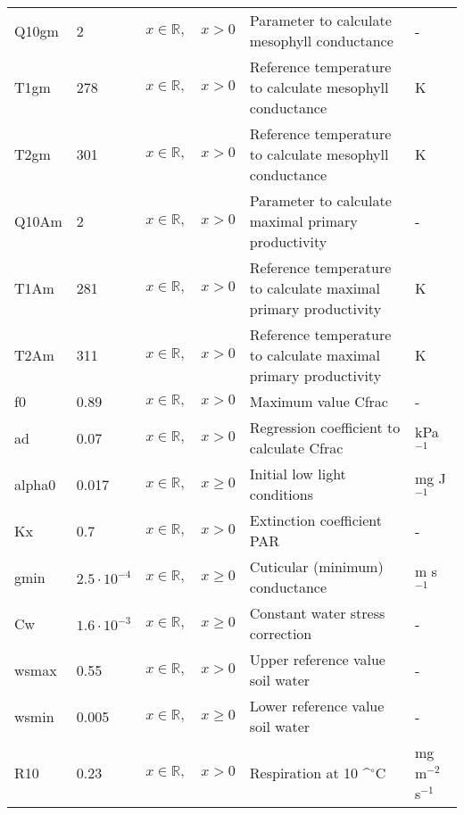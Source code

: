 \documentclass[twoside,11pt,fleqn,a4paper,english,openright]{report}
\def\degrees{\ifmmode^\circ\else$^\circ$\fi}
\begin{document}
\begin{center}
\begin{supertabular}{|l|p{1.6cm}|p{4cm}|p{6.3cm}|l|}
  Q10gm	& 2	& $x \in \mathbb{R}, \quad x > 0$ & Parameter to calculate mesophyll conductance & -\\
  T1gm	&  278	& $x \in \mathbb{R}, \quad x > 0$ & Reference temperature to calculate mesophyll conductance & K \\
  T2gm	&  301	& $x \in \mathbb{R}, \quad x > 0$ & Reference temperature to calculate mesophyll conductance & K \\
  Q10Am	& 2	& $x \in \mathbb{R}, \quad x > 0$ & Parameter to calculate maximal primary productivity & -\\
  T1Am	&  281	& $x \in \mathbb{R}, \quad x > 0$ & Reference temperature to calculate maximal primary productivity & K \\
  T2Am	&  311	& $x \in \mathbb{R}, \quad x > 0$ & Reference temperature to calculate maximal primary productivity & K \\
  f0	& 0.89	& $x \in \mathbb{R}, \quad x > 0$ & Maximum value Cfrac & -\\
  ad	& 0.07	& $x \in \mathbb{R}, \quad x > 0$ & Regression coefficient to calculate Cfrac & kPa$^{-1}$\\
  alpha0& 0.017	& $x \in \mathbb{R}, \quad x \geq 0$ & Initial  low light conditions & mg J$^{-1}$\\
  Kx	& 0.7	& $x \in \mathbb{R}, \quad x > 0$ & Extinction coefficient PAR	& -\\
  gmin	& $2.5 \cdot 10^{-4}$ & $x \in \mathbb{R}, \quad x \geq 0$ & Cuticular (minimum) conductance	& m s$^{-1}$\\
  Cw	& $1.6 \cdot 10^{-3}$	& $x \in \mathbb{R}, \quad x \geq 0$ & Constant water stress correction	& -\\
  wsmax	& 0.55	& $x \in \mathbb{R}, \quad x > 0$	& Upper reference value soil water	& -\\
  wsmin	& 0.005	& $x \in \mathbb{R}, \quad x \geq 0$	& Lower reference value soil water	& -\\
  R10	& 0.23	& $x \in \mathbb{R}, \quad x > 0$ & Respiration at 10 {\degrees}C & mg m$^{-2}$ s$^{-1}$\\
\end{supertabular}
\end{center}

\newpage
\end{document}
